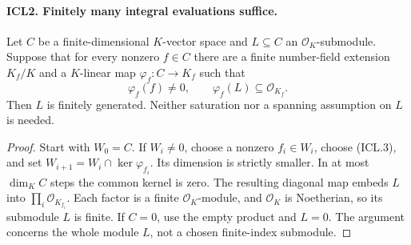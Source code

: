 \documentclass[11pt,a4paper]{article}
\numberwithin{equation}{section}
\theoremstyle{remark}\newtheorem{remark}[theorem]{Remark}
\begin{document}
\paragraph{ICL2. Finitely many integral evaluations suffice.}
\label{claim:ICL2}
Let \(C\) be a finite-dimensional \(K\)-vector space and
\(L\subseteq C\) an \(\mathcal O_K\)-submodule.  Suppose that for
every nonzero \(f\in C\) there are a finite number-field extension
\(K_f/K\) and a \(K\)-linear map \(\varphi_f:C\to K_f\) such that
\[
 \varphi_f(f)\ne0,\qquad \varphi_f(L)\subseteq\mathcal O_{K_f}.
                                                               \tag{ICL.3}
\]
Then \(L\) is finitely generated.  Neither saturation nor a spanning
assumption on \(L\) is needed.
\begin{proof}
Start with \(W_0=C\).  If \(W_i\ne0\), choose a nonzero
\(f_i\in W_i\), choose (ICL.3), and set
\(W_{i+1}=W_i\cap\ker\varphi_{f_i}\).  Its dimension is strictly
smaller.  In at most \(\dim_K C\) steps the common kernel is zero.
The resulting diagonal map embeds \(L\) into
\(\prod_i\mathcal O_{K_{f_i}}\).  Each factor is a finite
\(\mathcal O_K\)-module, and \(\mathcal O_K\) is Noetherian, so
its submodule \(L\) is finite.  If \(C=0\), use the empty product
and \(L=0\).  The argument concerns the whole module \(L\), not a
chosen finite-index submodule.
\end{proof}

\end{document}

